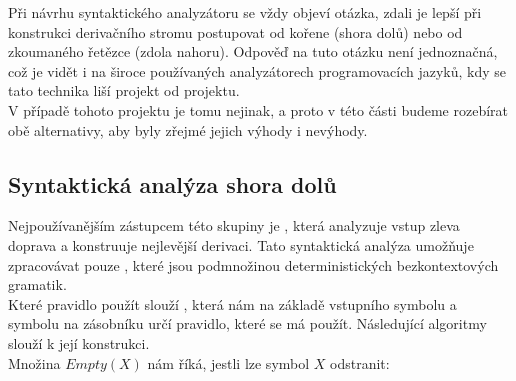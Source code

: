 Při návrhu syntaktického analyzátoru se vždy objeví otázka, zdali je lepší
při konstrukci derivačního stromu postupovat od kořene (shora dolů) nebo od
zkoumaného řetězce (zdola nahoru). Odpověď na tuto otázku není jednoznačná,
což je vidět i na široce používaných analyzátorech programovacích jazyků,
kdy se tato technika liší projekt od projektu.\\

V případě tohoto projektu je tomu nejinak, a proto v této části budeme rozebírat
obě alternativy, aby byly zřejmé jejich výhody i nevýhody.

\subsection{Syntaktická analýza shora dolů}

Nejpoužívanějším zástupcem této skupiny je , která analyzuje
vstup zleva doprava a konstruuje nejlevější derivaci. Tato syntaktická analýza
umožňuje zpracovávat pouze ,
které jsou podmnožinou deterministických bezkontextových gramatik.\\

Které pravidlo použít slouží , která nám na základě
vstupního symbolu a symbolu na zásobníku určí pravidlo, které se má použít.
Následující algoritmy slouží k její konstrukci.\\

\noindent
Množina $Empty(X)$ nám říká, jestli lze symbol $X$ odstranit:\\
\begin{algorithm}[H]
  \caption{$Empty(X)$}

  \BlankLine
\end{algorithm}
\vspace{0.5cm}


